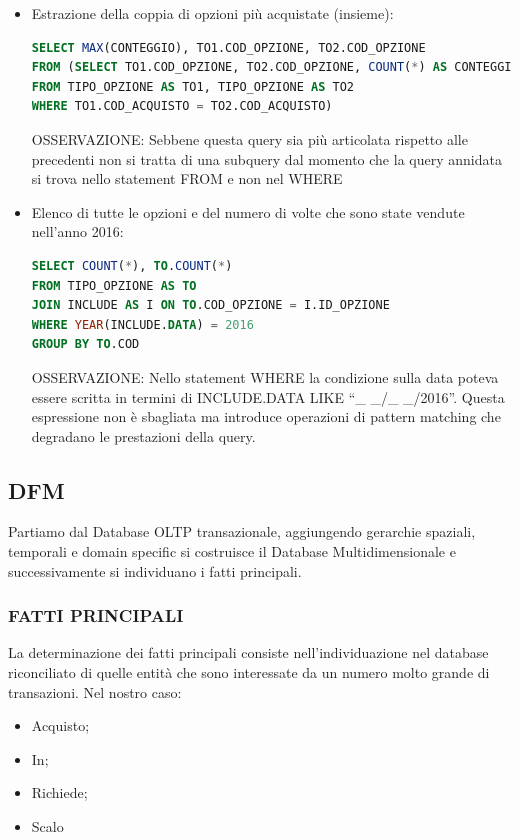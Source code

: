\begin{itemize}
\item Estrazione della coppia di opzioni più acquistate (insieme):

\begin{lstlisting}[language=SQL]
SELECT MAX(CONTEGGIO), TO1.COD_OPZIONE, TO2.COD_OPZIONE
FROM (SELECT TO1.COD_OPZIONE, TO2.COD_OPZIONE, COUNT(*) AS CONTEGGIO 
FROM TIPO_OPZIONE AS TO1, TIPO_OPZIONE AS TO2 
WHERE TO1.COD_ACQUISTO = TO2.COD_ACQUISTO) 
\end{lstlisting}

OSSERVAZIONE: Sebbene questa query sia più articolata rispetto alle precedenti non si tratta di una subquery dal momento che la query annidata si trova nello statement FROM e non nel WHERE

\item Elenco di tutte le opzioni e del numero di volte che sono state vendute nell’anno 2016:

\begin{lstlisting}[language=SQL]
SELECT COUNT(*), TO.COUNT(*)
FROM TIPO_OPZIONE AS TO
JOIN INCLUDE AS I ON TO.COD_OPZIONE = I.ID_OPZIONE 
WHERE YEAR(INCLUDE.DATA) = 2016
GROUP BY TO.COD  
\end{lstlisting}

OSSERVAZIONE: Nello statement WHERE la condizione sulla data poteva essere scritta in termini di INCLUDE.DATA LIKE “\_ \_/\_ \_/2016”. Questa espressione non è sbagliata ma introduce operazioni di pattern matching che degradano le prestazioni della query. 

\end{itemize}


\subsection{DFM}

Partiamo dal Database OLTP transazionale, aggiungendo gerarchie spaziali, temporali e domain specific si costruisce il Database Multidimensionale e successivamente si individuano i fatti principali.  

\subsubsection{FATTI PRINCIPALI}

La determinazione dei fatti principali consiste nell’individuazione nel database riconciliato di quelle entità che sono interessate da un numero molto grande di transazioni. Nel nostro caso:  

\begin{itemize}

\item Acquisto;
\item In;
\item Richiede;
\item Scalo  
\end{itemize}

